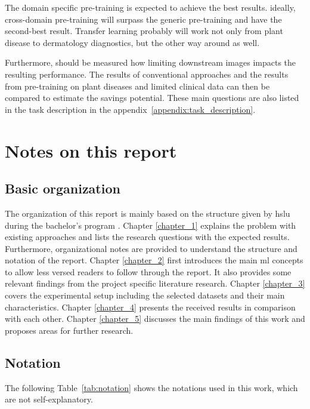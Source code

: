 The domain specific pre-training is expected to achieve the best results.
ideally, cross-domain pre-training will surpass the generic pre-training and have the second-best result.
Transfer learning probably will work not only from plant disease to dermatology diagnostics, but the other way around as well.


Furthermore, should be measured how limiting downstream images impacts the resulting performance. 
The results of conventional approaches and the results from pre-training on plant diseases and limited clinical data can then be compared to estimate the savings potential.
These main questions are also listed in the task description in the appendix~\ref{appendix:task_description}.

\section{Notes on this report}
\subsection{Basic organization}
The organization of this report is mainly based on the structure given by \gls{hslu} during the bachelor's program \autocite{balzert2011}.
Chapter \ref{chapter_1} explains the problem with existing approaches and lists the research questions with the expected results. 
Furthermore, organizational notes are provided to understand the structure and notation of the report.
Chapter \ref{chapter_2} first introduces the main \gls{ml} concepts to allow less versed readers to follow through the report.
It also provides some relevant findings from the project specific literature research.
Chapter \ref{chapter_3} covers the experimental setup including the selected datasets and their main characteristics.
Chapter \ref{chapter_4} presents the received results in comparison with each other.
Chapter \ref{chapter_5} discusses the main findings of this work and proposes areas for further research. 

\subsection{Notation}

The following Table~\ref{tab:notation} shows the notations used in this work, which are not self-explanatory.

